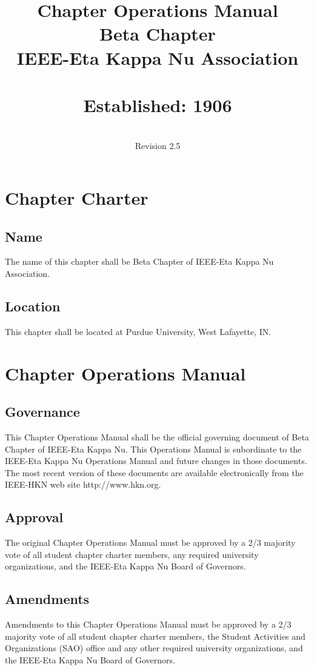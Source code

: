 \documentclass[10pt, oneside]{article}
\title{Chapter Operations Manual \\ Beta Chapter \\ IEEE-Eta Kappa Nu Association \\~\\ Established: 1906}
\author{\\Revision 2.5}
\date{}
\renewcommand{\thesection}{ARTICLE \Roman{section}}
\begin{document}
\pagestyle{fancy}
\fancyhead[R]{}
\renewcommand{\sectionmark}[1]{\markright{\MakeUppercase{\thesection. \ #1}}{}}
\renewcommand{\subsectionmark}[1]{}


\maketitle
\thispagestyle{empty}
\clearpage
\setcounter{page}{1}

\tableofcontents
\clearpage

\section{Chapter Charter}
\subsection{Name}
The name of this chapter shall be Beta Chapter of IEEE-Eta Kappa Nu Association.
\subsection{Location}
This chapter shall be located at Purdue University, West Lafayette, IN.

\section{Chapter Operations Manual}
\subsection{Governance}
This Chapter Operations Manual shall be the official governing document of Beta Chapter of IEEE-Eta Kappa Nu. This Operations Manual is subordinate to the IEEE-Eta Kappa Nu Operations Manual and future changes in those documents. The most recent version of these documents are available electronically from the IEEE-HKN web site http://www.hkn.org.
\subsection{Approval}
The original Chapter Operations Manual must be approved by a 2/3 majority vote of all student chapter charter members, any required university organizations, and the IEEE-Eta Kappa Nu Board of Governors.
\subsection{Amendments}
Amendments to this Chapter Operations Manual must be approved by a 2/3 majority vote of all student chapter charter members, the Student Activities and Organizations (SAO) office and any other required university organizations, and the IEEE-Eta Kappa Nu Board of Governors.
\end{document}
